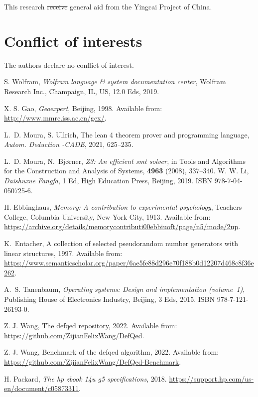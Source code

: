 \documentclass{aims}
\numberwithin{equation}{section}
\numberwithin{theorem}{section}	%
\numberwithin{axiom}{section}	%
\numberwithin{definition}{section}	%
\providecommand{\DIFadd}[1]{{\protect\color{blue}\uwave{#1}}} %
\providecommand{\DIFdel}[1]{{\protect\color{red}\sout{#1}}}                      %
\providecommand{\DIFaddbegin}{} %
\providecommand{\DIFaddend}{} %
\providecommand{\DIFdelbegin}{} %
\providecommand{\DIFdelend}{} %
\begin{document}
	 This research \DIFdelbegin \DIFdel{receive }\DIFdelend \DIFaddbegin \DIFadd{received }\DIFaddend general aid from the Yingcai Project of China.

	\section*{Conflict of interests}

	The authors declare no conflict of interest.

\begin{thebibliography}{999}

S. Wolfram,
 \emph{Wolfram language \& system documentation center},
 Wolfram Research Inc., Champaign, IL, US, 12.0 Eds, 2019.

X. S. Gao,
 {\it Geoexpert}, Beijing, 1998.
 Available from:
  \url{http://www.mmrc.iss.ac.cn/gex/}.

L.~D. Moura, S. Ullrich,
 The lean 4 theorem prover and programming language,
 \emph{Autom. Deduction -CADE}, 2021, 625--235. 

 
L.~D. Moura, N.~Bjørner,
 {\it Z3: An efficient smt solver,}
 in {Tools and Algorithms for the Construction and Analysis of
  Systems}, {\bf 4963} (2008), 337--340.
W. W. Li,
 \emph{Daishuxue Fangfa}, 1 Ed, 
 High Education Press, Beijing, 2019.
 ISBN 978-7-04-050725-6.

H. Ebbinghaus,
 \emph{Memory: A contribution to experimental psychology},
 Teachers College, Columbia University, New York City, 1913.
 Available from:
  \url{https://archive.org/details/memorycontributi00ebbiuoft/page/n5/mode/2up}.

K.~Entacher,
 A collection of selected pseudorandom number generators with linear structures, 1997.
 Available from:
  \url{https://www.semanticscholar.org/paper/6ae5fe88d296e70f188b0d12207d468c8f36e262}.

A.~S. Tanenbaum,
 \emph{Operating systems: Design and implementation (volume~1)}, 
 Publishing House of Electronics Industry, Beijing, 3 Eds, 2015.
 ISBN 978-7-121-26193-0.

Z. J. Wang,
 The defqed repository, 
2022.
 Available from: \url{https://github.com/ZijianFelixWang/DefQed}.

Z. J. Wang,
 Benchmark of the defqed algorithm, 2022.
 Available from: \url{https://github.com/ZijianFelixWang/DefQed-Benchmark}.

H. Packard,
 {\it The hp zbook 14u g5 specifications}, 2018. 
 \url{https://support.hp.com/us-en/document/c05873311}. 


\end{thebibliography}

	
	
\end{document}
